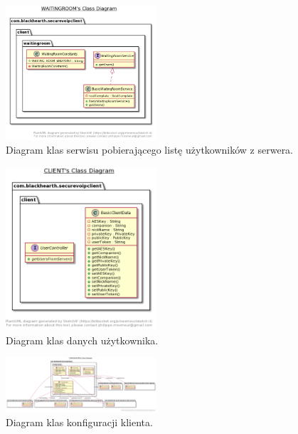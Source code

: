\begin{figure}[H]
	\includegraphics[width=0.5\textwidth]{images/uml/4.png}
	\centering	
	\caption{\centering Diagram klas serwisu pobierającego listę użytkowników z serwera.}
\end{figure}
\begin{figure}[H]
	\includegraphics[width=0.5\textwidth]{images/uml/5.png}
	\centering	
	\caption{\centering Diagram klas danych użytkownika.}
\end{figure}
\begin{figure}[H]
	\includegraphics[width=0.5\textwidth]{images/uml/6.png}
	\centering	
	\caption{\centering Diagram klas konfiguracji klienta.}
\end{figure}

